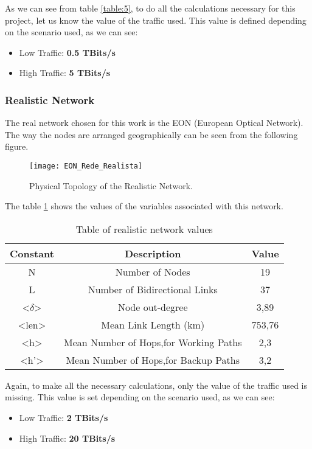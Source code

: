 As we can see from table \ref{table:5}, to do all the calculations necessary for this project, let us know the value of the traffic used. This value is defined depending on the scenario used, as we can see:
\begin{itemize}
  \item Low Traffic: \textbf{0.5 TBits/s}
  \item High Traffic: \textbf{5 TBits/s}
\end{itemize}

\subsubsection{Realistic Network}
The real network chosen for this work is the EON (European Optical Network).
The way the nodes are arranged geographically can be seen from the following figure.

\begin{figure}[h!]
\centering
\texttt{[image: EON\_Rede\_Realista]}
\caption{Physical Topology of the Realistic Network.}
\end{figure}

\begin{table}[h!]
The table \ref{table:6} shows the values of the variables associated with this network.\vspace{10pt}
\centering
\begin{tabular}{|| c | c | c||}
 \hline
 Constant & Description & Value \\
 \hline\hline
 N & Number of Nodes & 19 \\
 L & Number of Bidirectional Links & 37 \\
 <$\delta$> & Node out-degree & 3,89 \\
 <len> & Mean Link Length (km) & 753,76 \\
 <h> & Mean Number of Hops,for Working Paths & 2,3 \\
 <h'> & Mean Number of Hops,for Backup Paths & 3,2 \\
 \hline
\end{tabular}
\caption{Table of realistic network values}
\label{table:6}
\end{table}

Again, to make all the necessary calculations, only the value of the traffic used is missing. This value is set depending on the scenario used, as we can see:

\begin{itemize}
  \item Low Traffic: \textbf{2 TBits/s}
  \item High Traffic: \textbf{20 TBits/s}
\end{itemize}

